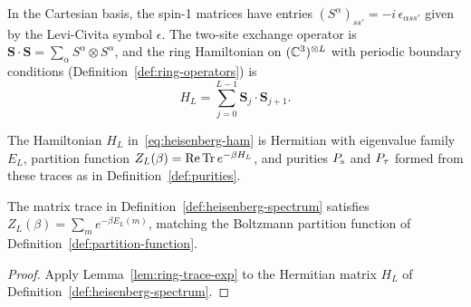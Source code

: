 \begin{definition}
  \label{def:heisenberg}
  \leanok
  In the Cartesian basis, the spin-1 matrices have entries \((S^\alpha)_{ss'} = -i\,\epsilon_{\alpha
    s s'}\)
  given by the Levi-Civita symbol \(\epsilon\). The two-site exchange operator is
  \(\mathbf S \cdot \mathbf S = \sum_\alpha S^\alpha \otimes S^\alpha\), and the ring Hamiltonian on
  \((\mathbb{C}^3)^{\otimes L}\) with periodic boundary conditions (Definition~\ref{def:ring-operators}) is
  \begin{equation}
    \label{eq:heisenberg-ham}
    H_L = \sum_{j=0}^{L-1} \mathbf S_j \cdot \mathbf S_{j+1}.
  \end{equation}
\end{definition}

\begin{definition}
  \label{def:heisenberg-spectrum}
  \leanok
  The Hamiltonian \(H_L\) in~\eqref{eq:heisenberg-ham} is Hermitian with eigenvalue family \(E_L\),
  partition function \(Z_L(\beta) = \operatorname{Re}\operatorname{Tr} e^{-\beta H_L}\), and purities \(P_{\mathrm{s}}\) and
  \(P_{\tau}\) formed from these traces as in Definition~\ref{def:purities}.
\end{definition}

\begin{lemma}
  \label{lem:heisenberg-trace}
  \leanok
  The matrix trace in Definition~\ref{def:heisenberg-spectrum} satisfies
  \(Z_L(\beta) = \sum_m e^{-\beta E_L(m)}\), matching the Boltzmann partition function of
  Definition~\ref{def:partition-function}.
\end{lemma}
\begin{proof}
  \leanok
  Apply Lemma~\ref{lem:ring-trace-exp} to the Hermitian matrix \(H_L\) of
  Definition~\ref{def:heisenberg-spectrum}.
\end{proof}

